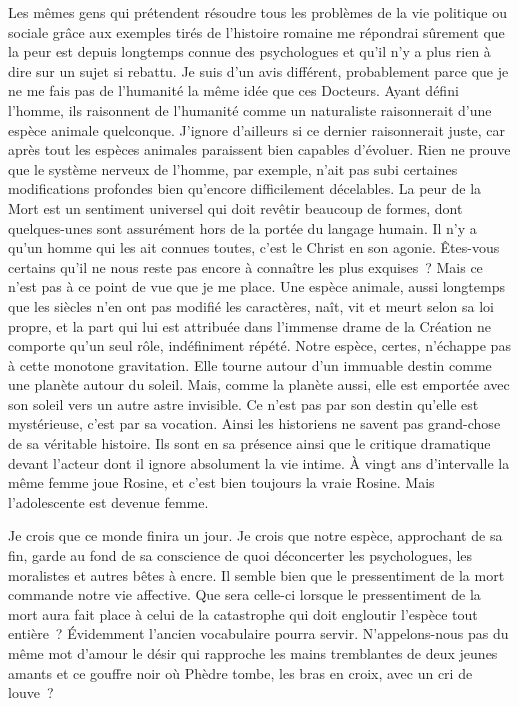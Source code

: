 \documentclass[french,twoside]{book} %
\newcommand{\astertri}{\medskip\par\centerline{\color{rubric}\large\selectfont{\syms ✻\,✻\,✻}}\medskip\par}%
\begin{document}
\astertri

\noindent Les mêmes gens qui prétendent résoudre tous les problèmes de la vie politique ou sociale grâce aux exemples tirés de l’histoire romaine me répondrai sûrement que la peur est depuis longtemps connue des psychologues et qu’il n’y a plus rien à dire sur un sujet si rebattu. Je suis d’un avis différent, probablement parce que je ne me fais pas de l’humanité la même idée que ces Docteurs. Ayant défini l’homme, ils raisonnent de l’humanité comme un naturaliste raisonnerait d’une espèce animale quelconque. J’ignore d’ailleurs si ce dernier raisonnerait juste, car après tout les espèces animales paraissent bien capables d’évoluer. Rien ne prouve que le système nerveux de l’homme, par exemple, n’ait pas subi certaines modifications profondes bien qu’encore difficilement décelables. La peur de la Mort est un sentiment universel qui doit revêtir beaucoup de formes, dont quelques-unes sont assurément hors de la portée du langage humain. Il n’y a qu’un homme qui les ait connues toutes, c’est le Christ en son agonie. Êtes-vous certains qu’il ne nous reste pas encore à connaître les plus exquises ? Mais ce n’est pas à ce point de vue que je me place. Une espèce animale, aussi longtemps que les siècles n’en ont pas modifié les caractères, naît, vit et meurt selon sa loi propre, et la part qui lui est attribuée dans l’immense drame de la Création ne comporte qu’un seul rôle, indéfiniment répété. Notre espèce, certes, n’échappe pas à cette monotone gravitation. Elle tourne autour d’un immuable destin comme une planète autour du soleil. Mais, comme la planète aussi, elle est emportée avec son soleil vers un autre astre invisible. Ce n’est pas par son destin qu’elle est mystérieuse, c’est par sa vocation. Ainsi les historiens ne savent pas grand-chose de sa véritable histoire. Ils sont en sa présence ainsi que le critique dramatique devant l’acteur dont il ignore absolument la vie intime. À vingt ans d’intervalle la même femme joue Rosine, et c’est bien toujours la vraie Rosine. Mais l’adolescente est devenue femme.\par
\bigbreak
\noindent Je crois que ce monde finira un jour. Je crois que notre espèce, approchant de sa fin, garde au fond de sa conscience de quoi déconcerter les psychologues, les moralistes et autres bêtes à encre. Il semble bien que le pressentiment de la mort commande notre vie affective. Que sera celle-ci lorsque le pressentiment de la mort aura fait place à celui de la catastrophe qui doit engloutir l’espèce tout entière ? Évidemment l’ancien vocabulaire pourra servir. N’appelons-nous pas du même mot d’amour le désir qui rapproche les mains tremblantes de deux jeunes amants et ce gouffre noir où Phèdre tombe, les bras en croix, avec un cri de louve ?\par
\end{document}
